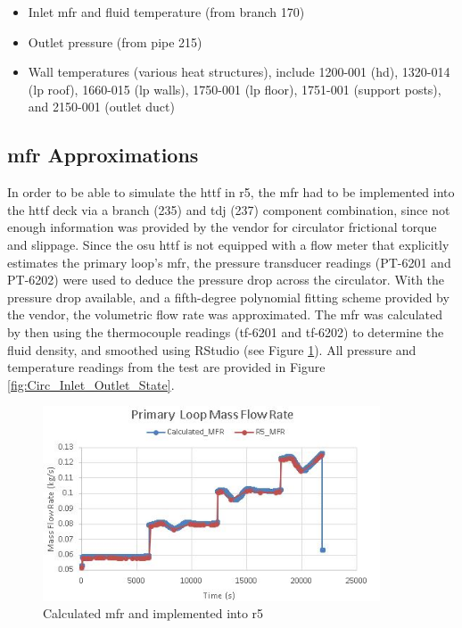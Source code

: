 \documentclass[double,12pt]{beavtex}
\begin{document}
\begin{itemize}
    \item Inlet \acrshort{mfr} and fluid temperature (from branch 170)
    \item Outlet pressure (from pipe 215)
    \item Wall temperatures (various heat structures), include 1200-001 (\acrshort{hd}), 1320-014 (\acrshort{lp} roof), 1660-015 (\acrshort{lp} walls), 1750-001 (\acrshort{lp} floor), 1751-001 (support posts), and 2150-001 (outlet duct)
\end{itemize}

\subsection{\acrshort{mfr} Approximations}

In order to be able to simulate the \acrshort{httf} in \acrshort{r5}, the \acrshort{mfr} had to be implemented into the \acrshort{httf} deck via a branch (235) and \acrshort{tdj} (237) component combination, since not enough information was provided by the vendor for circulator frictional torque and slippage. Since the \acrshort{osu} \acrshort{httf} is not equipped with a flow meter that explicitly estimates the primary loop’s \acrshort{mfr}, the pressure transducer readings (PT-6201 and PT-6202) were used to deduce the pressure drop across the circulator. With the pressure drop available, and a fifth-degree polynomial fitting scheme provided by the vendor, the volumetric flow rate was approximated. The \acrshort{mfr} was calculated by then using the thermocouple readings (\acrshort{tf}-6201 and \acrshort{tf}-6202) to determine the fluid density, and smoothed using RStudio (see Figure \ref{fig:Calculated_MFR}). All pressure and temperature readings from the test are provided in Figure \ref{fig:Circ_Inlet_Outlet_State}. 

\begin{figure}
    \begin{center}
    	\includegraphics[width=10cm]{Figures/Calculated_MFR.JPG}
    	\caption{Calculated \acrshort{mfr} and implemented into \acrshort{r5}}
    	\label{fig:Calculated_MFR}
    	\end{center}
\end{figure}
\end{document}

